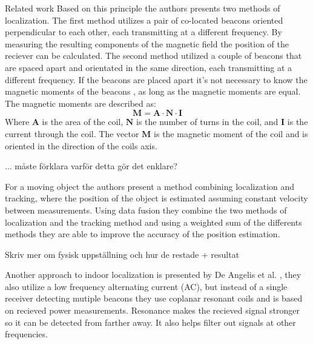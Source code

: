 \begin{section}{Related work}
    Based on this principle the authors presents two methods of localization. 
    The first method utilizes a pair of co-located beacons oriented perpendicular to each other, each transmitting at a different frequency.
    By measuring the resulting components of the magnetic field the position of the reciever can be calculated.
    The second method utilized a couple of beacons that are spaced apart and orientated in the same direction, each transmitting at a different frequency.
    If the beacons are placed apart it's not necessary to know the magnetic moments of the beacons , as long as the magnetic moments are equal.
    The magnetic moments are described as:
    \begin{equation}
        \mathbf{M} = \mathbf{A} \cdot \mathbf{N} \cdot \mathbf{I}
    \end{equation}
    Where $\mathbf{A}$ is the area of the coil, $\mathbf{N}$ is the number of turns in the coil, and $\mathbf{I}$ is the current through the coil.
    The vector $\mathbf{M}$ is the magnetic moment of the coil and is oriented in the direction of the coils axis. 

    ... måste förklara varför detta gör det enklare? 

    For a moving object the authors present a method combining localization and tracking, where the position of the object is estimated assuming constant velocity between measurements.
    Using data fusion they combine the two methods of localization and the tracking method and using a weighted sum of the differents methods they are able to improve the accuracy of the position estimation. 

    Skriv mer om fysisk uppställning och hur de restade + resultat

    Another approach to indoor localization is presented by De Angelis et al. \cite{deangelis2015indoor}, they also utilize a low frequency alternating current (AC), but instead of a single receiver detecting mutiple beacons they use coplanar resonant coils and is based on recieved power measurements.
    Resonance makes the recieved signal stronger so it can be detected from farther away. It also helps filter out signals at other frequencies.


\end{section}
